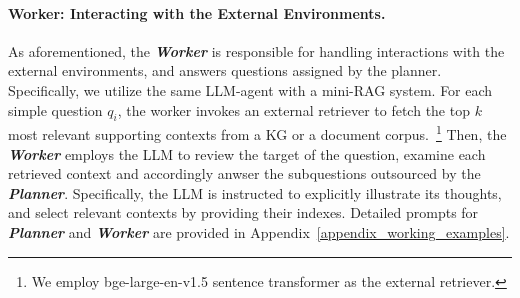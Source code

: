 \paragraph{Worker: Interacting with the External Environments.}

As aforementioned, the \textbf{\emph{Worker}} is responsible for handling interactions with the external environments, and answers questions assigned by the planner. 
Specifically, we utilize the same LLM-agent with a mini-RAG system.
For each simple question $q_i$, the worker invokes an external retriever to fetch the top $k$ most relevant supporting contexts from a KG or a document corpus.~\footnote{We employ bge-large-en-v1.5 sentence transformer as the external retriever. 
}
Then, the \textbf{\emph{Worker}} employs the LLM to review the target of the question, examine each retrieved context and accordingly anwser the subquestions outsourced by the \textbf{\emph{Planner}}. Specifically, the LLM is instructed to explicitly illustrate its thoughts, and select  relevant contexts by providing their indexes.
Detailed prompts for \textbf{\emph{Planner}} and \textbf{\emph{Worker}} are provided in Appendix~\ref{appendix_working_examples}.




